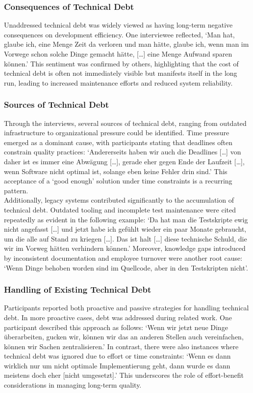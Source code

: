 \subsubsection{Consequences of Technical Debt}
Unaddressed technical debt was widely viewed as having long-term negative consequences on development efficiency. One interviewee reflected, `Man hat, glaube ich, eine Menge Zeit da verloren und man hätte, glaube ich, wenn man im Vorwege schon solche Dinge gemacht hätte, [\ldots] eine Menge Aufwand sparen können.'
This sentiment was confirmed by others, highlighting that the cost of technical debt is often not immediately visible but manifests itself in the long run, leading to increased maintenance efforts and reduced system reliability.\\

\subsubsection{Sources of Technical Debt}
Through the interviews, several sources of technical debt, ranging from outdated infrastructure to organizational pressure could be identified. Time pressure emerged as a dominant cause, with participants stating that deadlines often constrain quality practices: `Andererseits haben wir auch die Deadlines [\ldots] von daher ist es immer eine Abwägung
[\ldots], gerade eher gegen Ende der Laufzeit [\ldots], wenn Software nicht optimal ist, solange eben keine Fehler drin sind.' This acceptance of a `good enough' solution under time constraints is a recurring pattern.\\

Additionally, legacy systems contributed significantly to the accumulation of technical debt. Outdated tooling and incomplete test maintenance were cited repeatedly as evident in the following example: `Da hat man die Testskripte ewig nicht angefasst [\ldots] und jetzt habe ich gefühlt wieder ein paar Monate gebraucht, um die alle auf Stand zu kriegen [\ldots].
Das ist halt [\ldots] diese technische Schuld, die wir im Vorweg hätten verhindern können.' Moreover, knowledge gaps introduced by inconsistent documentation and employee turnover were another root cause: `Wenn Dinge behoben worden sind im Quellcode, aber in den Testskripten nicht'.

\subsubsection{Handling of Existing Technical Debt}
Participants reported both proactive and passive strategies for handling technical debt. In more proactive cases, debt was addressed during related work. One participant described this approach as follows: `Wenn wir jetzt neue Dinge überarbeiten, gucken wir, können wir das an anderen Stellen auch vereinfachen, können wir Sachen zentralisieren.'
In contrast, there were also instances where technical debt was ignored due to effort or time constraints: `Wenn es dann wirklich nur um nicht optimale Implementierung geht, dann wurde es dann meistens doch eher [nicht umgesetzt].'
This underscores the role of effort-benefit considerations in managing long-term quality.\\

